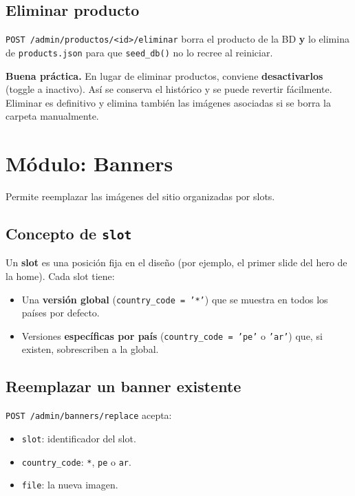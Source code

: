 \documentclass[11pt,a4paper]{article}
\begin{document}
\subsection{Eliminar producto}

\texttt{POST /admin/productos/<id>/eliminar} borra el producto de la BD
\textbf{y} lo elimina de \texttt{products.json} para que \texttt{seed\_db()}
no lo recree al reiniciar.

\begin{tipbox}
\textbf{Buena práctica.} En lugar de eliminar productos, conviene
\textbf{desactivarlos} (toggle a inactivo). Así se conserva el histórico
y se puede revertir fácilmente. Eliminar es definitivo y elimina también
las imágenes asociadas si se borra la carpeta manualmente.
\end{tipbox}

\section{Módulo: Banners}

Permite reemplazar las imágenes del sitio organizadas por slots.

\subsection{Concepto de \texttt{slot}}

Un \textbf{slot} es una posición fija en el diseño (por ejemplo, el primer
slide del hero de la home). Cada slot tiene:

\begin{itemize}[leftmargin=*]
    \item Una \textbf{versión global} (\texttt{country\_code = '*'}) que
        se muestra en todos los países por defecto.
    \item Versiones \textbf{específicas por país} (\texttt{country\_code
        = 'pe'} o \texttt{'ar'}) que, si existen, sobrescriben a la
        global.
\end{itemize}

\subsection{Reemplazar un banner existente}

\texttt{POST /admin/banners/replace} acepta:
\begin{itemize}[leftmargin=*]
    \item \texttt{slot}: identificador del slot.
    \item \texttt{country\_code}: \texttt{*}, \texttt{pe} o \texttt{ar}.
    \item \texttt{file}: la nueva imagen.
\end{itemize}
\end{document}
